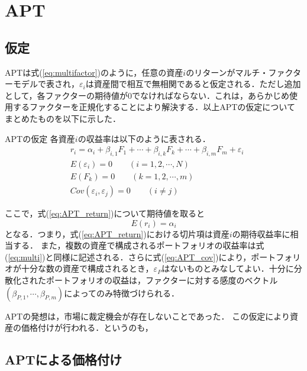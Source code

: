 \documentclass[11pt]{jreport}
\begin{document}

\section{APT}

\subsection{仮定}
APTは式(\ref{eq:multifactor})のように，任意の資産$i$のリターンがマルチ・ファクターモデルで表され，$\varepsilon_i$は資産間で相互で無相関であると仮定される．ただし追加として，各ファクターの期待値が0でなければならない．これは，あらかじめ使用するファクターを正規化することにより解決する．以上APTの仮定についてまとめたものを以下に示した．

\begin{itembox}[l]{APTの仮定}
各資産$i$の収益率は以下のように表される．
\begin{eqnarray}
& r_i = \alpha_i + \beta_{i,1}F_1 + \cdots + \beta_{i,k}F_k + \cdots + \beta_{i,m}F_m + \varepsilon_i\label{eq:APT_return} \\
& E(\varepsilon_i) = 0 \qquad (i=1,2,\cdots,N)\\
& E(F_k) = 0 \qquad (k=1,2,\cdots,m)\\
& Cov(\varepsilon_i, \varepsilon_j) = 0 \qquad (i \neq j) \label{eq:APT_cov}
\end{eqnarray}
\end{itembox}
ここで，式(\ref{eq:APT_return})について期待値を取ると
\begin{equation}
E(r_i) = \alpha_i
\end{equation}
となる．つまり，式(\ref{eq:APT_return})における切片項は資産$i$の期待収益率に相当する．
また，複数の資産で構成されるポートフォリオの収益率は式(\ref{eq:multi})と同様に記述される．さらに式(\ref{eq:APT_cov})により，ポートフォリオが十分な数の資産で構成されるとき，$\varepsilon_P$はないものとみなしてよい．十分に分散化されたポートフォリオの収益は，ファクターに対する感度のベクトル$(\beta_{P,1},\cdots,\beta_{P,m})$によってのみ特徴づけられる．

APTの発想は，市場に裁定機会が存在しないことであった．
この仮定により資産の価格付けが行われる．というのも，

\subsection{APTによる価格付け}
\end{document}
